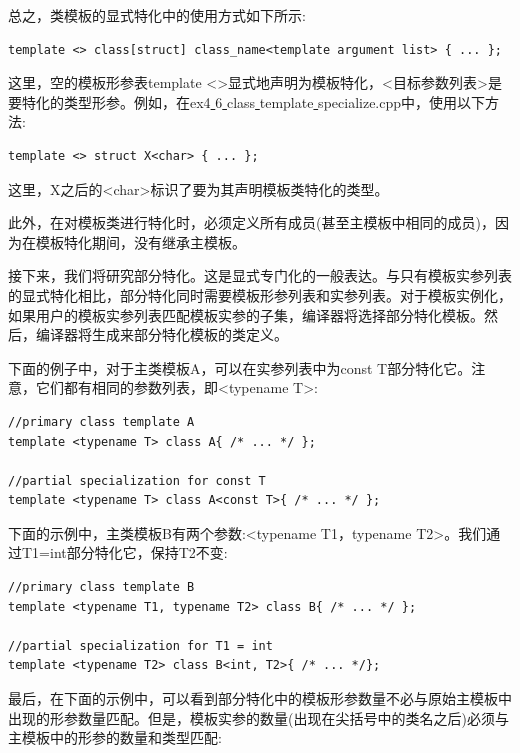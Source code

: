 总之，类模板的显式特化中的使用方式如下所示: \par

\begin{lstlisting}[caption={}]
template <> class[struct] class_name<template argument list> { ... };
\end{lstlisting}

这里，空的模板形参表template <>显式地声明为模板特化，<目标参数列表>是要特化的类型形参。例如，在ex4\underline{ }6\underline{ }class\underline{ }template\underline{ }specialize.cpp中，使用以下方法: \par

\begin{lstlisting}[caption={}]
template <> struct X<char> { ... };
\end{lstlisting}

这里，X之后的<char>标识了要为其声明模板类特化的类型。\par
此外，在对模板类进行特化时，必须定义所有成员(甚至主模板中相同的成员)，因为在模板特化期间，没有继承主模板。 \par
接下来，我们将研究部分特化。这是显式专门化的一般表达。与只有模板实参列表的显式特化相比，部分特化同时需要模板形参列表和实参列表。对于模板实例化，如果用户的模板实参列表匹配模板实参的子集，编译器将选择部分特化模板。然后，编译器将生成来部分特化模板的类定义。 \par
下面的例子中，对于主类模板A，可以在实参列表中为const T部分特化它。注意，它们都有相同的参数列表，即<typename T>: \par

\begin{lstlisting}[caption={}]
//primary class template A
template <typename T> class A{ /* ... */ };

//partial specialization for const T
template <typename T> class A<const T>{ /* ... */ };
\end{lstlisting}

下面的示例中，主类模板B有两个参数:<typename T1，typename T2>。我们通过T1=int部分特化它，保持T2不变: \par

\begin{lstlisting}[caption={}]
//primary class template B
template <typename T1, typename T2> class B{ /* ... */ };

//partial specialization for T1 = int
template <typename T2> class B<int, T2>{ /* ... */};
\end{lstlisting}

最后，在下面的示例中，可以看到部分特化中的模板形参数量不必与原始主模板中出现的形参数量匹配。但是，模板实参的数量(出现在尖括号中的类名之后)必须与主模板中的形参的数量和类型匹配: \par

